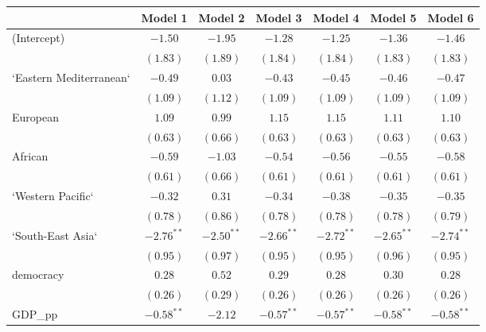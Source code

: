 
\begin{table}[!h]
\begin{center}
\begin{tabular}{l c c c c c c }
\toprule
 & Model 1 & Model 2 & Model 3 & Model 4 & Model 5 & Model 6 \\
\midrule
(Intercept)             & $-1.50$      & $-1.95$      & $-1.28$      & $-1.25$      & $-1.36$      & $-1.46$      \\
                        & $(1.83)$     & $(1.89)$     & $(1.84)$     & $(1.84)$     & $(1.83)$     & $(1.83)$     \\
`Eastern Mediterranean` & $-0.49$      & $0.03$       & $-0.43$      & $-0.45$      & $-0.46$      & $-0.47$      \\
                        & $(1.09)$     & $(1.12)$     & $(1.09)$     & $(1.09)$     & $(1.09)$     & $(1.09)$     \\
European                & $1.09$       & $0.99$       & $1.15$       & $1.15$       & $1.11$       & $1.10$       \\
                        & $(0.63)$     & $(0.66)$     & $(0.63)$     & $(0.63)$     & $(0.63)$     & $(0.63)$     \\
African                 & $-0.59$      & $-1.03$      & $-0.54$      & $-0.56$      & $-0.55$      & $-0.58$      \\
                        & $(0.61)$     & $(0.66)$     & $(0.61)$     & $(0.61)$     & $(0.61)$     & $(0.61)$     \\
`Western Pacific`       & $-0.32$      & $0.31$       & $-0.34$      & $-0.38$      & $-0.35$      & $-0.35$      \\
                        & $(0.78)$     & $(0.86)$     & $(0.78)$     & $(0.78)$     & $(0.78)$     & $(0.79)$     \\
`South-East Asia`       & $-2.76^{**}$ & $-2.50^{**}$ & $-2.66^{**}$ & $-2.72^{**}$ & $-2.65^{**}$ & $-2.74^{**}$ \\
                        & $(0.95)$     & $(0.97)$     & $(0.95)$     & $(0.95)$     & $(0.96)$     & $(0.95)$     \\
democracy               & $0.28$       & $0.52$       & $0.29$       & $0.28$       & $0.30$       & $0.28$       \\
                        & $(0.26)$     & $(0.29)$     & $(0.26)$     & $(0.26)$     & $(0.26)$     & $(0.26)$     \\
GDP\_pp                 & $-0.58^{**}$ & $-2.12$      & $-0.57^{**}$ & $-0.57^{**}$ & $-0.58^{**}$ & $-0.58^{**}$ \\

\end{tabular}
\end{center}
\end{table}
